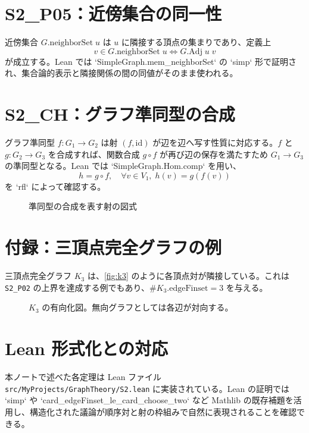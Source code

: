 \documentclass[a4paper]{ltjsarticle}
\begin{document}
\section{S2\_P05：近傍集合の同一性}
近傍集合 $G.\mathrm{neighborSet}\;u$ は $u$ に隣接する頂点の集まりであり、定義上
\[
  v \in G.\mathrm{neighborSet}\;u \iff G.\mathrm{Adj}\;u\;v
\]
が成立する。Lean では `SimpleGraph.mem_neighborSet` の `simp` 形で証明され、集合論的表示と隣接関係の間の同値がそのまま使われる。

\section{S2\_CH：グラフ準同型の合成}
グラフ準同型 $f : G_1 \to G_2$ は射 $(f,\mathrm{id})$ が辺を辺へ写す性質に対応する。$f$ と $g : G_2 \to G_3$ を合成すれば、関数合成 $g \circ f$ が再び辺の保存を満たすため $G_1 \to G_3$ の準同型となる。Lean では `SimpleGraph.Hom.comp` を用い、
\[
  h = g \circ f,\quad \forall v \in V_1,\; h(v) = g(f(v))
\]
を `rfl` によって確認する。

\begin{figure}[htbp]
  \centering
  \caption{準同型の合成を表す射の図式}
  \label{fig:hom-comp}
\end{figure}

\section{付録：三頂点完全グラフの例}
三頂点完全グラフ $K_3$ は、\autoref{fig:k3} のように各頂点対が隣接している。これは \texttt{S2\_P02} の上界を達成する例でもあり、$\#K_3.\mathrm{edgeFinset} = 3$ を与える。

\begin{figure}[htbp]
  \centering
  \caption{$K_3$ の有向化図。無向グラフとしては各辺が対向する。}
  \label{fig:k3}
\end{figure}

\section{Lean 形式化との対応}
本ノートで述べた各定理は Lean ファイル \texttt{src/\allowbreak MyProjects/\allowbreak GraphTheory/\allowbreak S2.lean} に実装されている。Lean の証明では `simp` や `card_edgeFinset_le_card_choose_two` など Mathlib の既存補題を活用し、構造化された議論が順序対と射の枠組みで自然に表現されることを確認できる。
\end{document}
